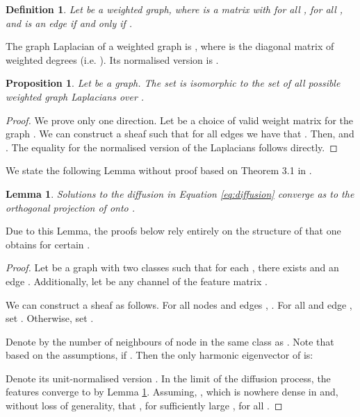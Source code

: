 \documentclass{article}
\newtheorem{lemma}[theorem]{Lemma}
\newtheorem{proposition}[theorem]{Proposition}
\newtheorem{definition}[theorem]{Definition}
\begin{document}
\begin{definition}
Let  be a weighted graph, where  is a matrix with  for all ,  for all , and  is an edge if and only if . 
\end{definition}

The graph Laplacian of a weighted graph is , where  is the diagonal matrix of weighted degrees (i.e. ). Its normalised version is . 

\begin{proposition}
Let  be a graph. The set  is isomorphic to the set of all possible weighted graph Laplacians over . 
\end{proposition}

\begin{proof}
We prove only one direction. Let  be a choice of valid weight matrix for the graph . We can construct a sheaf  such that for all edges  we have that . Then,  and . The equality for the normalised version of the Laplacians follows directly.
\end{proof}

We state the following Lemma without proof based on Theorem 3.1 in \citet{hansen2021opinion}. 

\begin{lemma}\label{lemma:harmonic_convergence}
Solutions  to the diffusion in Equation \ref{eq:diffusion} converge as  to the orthogonal projection of  onto . 
\end{lemma}

Due to this Lemma, the proofs below rely entirely on the structure of  that one obtains for certain . 

\HOneSymHomophily*
\begin{proof}
Let  be a graph with two classes  such that for each , there exists  and an edge . Additionally, let  be any channel of the feature matrix . 

We can construct a sheaf  as follows. For all nodes  and edges , . For all  and edge , set . Otherwise, set . 

Denote by  the number of neighbours of node  in the same class as  . Note that based on the assumptions,  if . Then the only harmonic eigenvector of  is:

Denote its unit-normalised version . In the limit of the diffusion process, the features converge to  by Lemma \ref{lemma:harmonic_convergence}. Assuming, , which is nowhere dense in  and, without loss of generality, that , for sufficiently large ,  for all . 
\end{proof}
\end{document}
